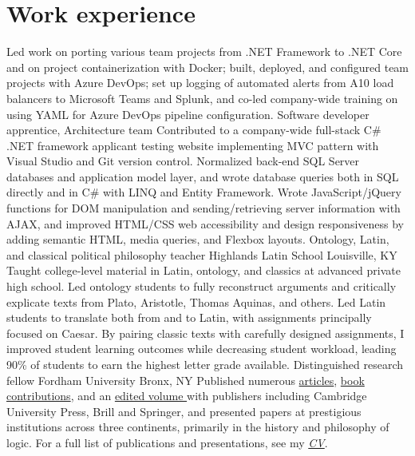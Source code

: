\section{Work experience}
{Led work on porting various team projects from .NET Framework to .NET Core and on project containerization with Docker; built, deployed, and configured team projects with Azure DevOps; set up logging of automated alerts from A10 load balancers to Microsoft Teams and Splunk, and co-led company-wide training on using YAML for Azure DevOps pipeline configuration.
}
{Software developer apprentice, Architecture team}
{}
{}
{}
{Contributed to a company-wide full-stack C\# .NET framework applicant testing website implementing MVC pattern with Visual Studio and Git version control. Normalized back-end SQL Server databases and application model layer, and wrote database queries both in SQL directly and in C\# with LINQ and Entity Framework. Wrote JavaScript/jQuery functions for DOM manipulation and sending/retrieving server information with AJAX, and improved HTML/CSS web accessibility and design responsiveness by adding semantic HTML, media queries, and Flexbox layouts. 
	}
{Ontology, Latin, and classical political philosophy teacher}
{Highlands Latin School}
{Louisville, KY}
{}
{Taught college-level material in Latin, ontology, and classics at advanced private high school. 
	Led ontology students to fully reconstruct arguments 
	and critically explicate texts from Plato, Aristotle, Thomas Aquinas, and others. 
	Led Latin students to translate both from and to Latin, 
	with assignments principally focused on Caesar. 
	By pairing classic texts with carefully designed assignments, 
	I improved student learning outcomes 
	while decreasing student workload, 
	leading 90\% of students to earn the highest letter grade available.}
{Distinguished research fellow}
{Fordham University}
{Bronx, NY}
{}
{Published numerous \href{https://fordham.academia.edu/jacobarchambault}{articles}, \href{https://www.collegepublications.co.uk/dialogues/?00005}{book} \href{https://www.cambridgescholars.com/hylomorphism-and-mereology}{contributions}, and an \href{https://brill.com/view/journals/viv/56/3-4/viv.56.issue-3-4.xml?language=en}{edited volume }
	with publishers including Cambridge University Press, Brill and Springer, 
	and presented papers at prestigious institutions across three continents, 
	primarily in the history and philosophy of logic. 
	For a full list of publications and presentations, see my 
	\href{https://jacobarchambault.com/curriculum-vitae}{\emph{CV}}.}
